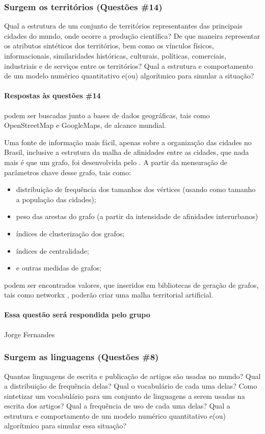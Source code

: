 \subsubsection{Surgem os territórios (Questões \#14)}

Qual a estrutura de um conjunto de territórios representantes das principais cidades do mundo, onde ocorre a produção científica? De que maneira representar os atributos sintéticos dos territórios, bem como os vínculos físicos, informacionais, similaridades históricas, culturais, políticas, comerciais, industriais e de serviços entre os territórios? Qual a estrutura e comportamento de um modelo numérico quantitativo e(ou) algorítmico para simular a situação? 

\paragraph{Respostas às questões \#14} podem ser buscadas junto a bases de dados geográficas, tais como OpenStreetMap e GoogleMaps, de alcance mundial. 

Uma fonte de informação mais fácil, apenas sobre a organização das cidades no Brasil, inclusive a estrutura da malha de afinidades entre as cidades, que nada mais é que um grafo, foi desenvolvida pelo \cite{ibge_regioes_2021}. 
A partir da mensuração de parâmetros chave desse grafo, tais como:
\begin{itemize}
    \item distribuição de frequência dos tamanhos dos vértices (usando como tamanho a população das cidades);
    \item peso das arestas do grafo (a partir da intensidade de afinidades interurbanos)
    \item índices de clusterização dos grafos;
    \item índices de centralidade;
    \item e outras medidas de grafos;
\end{itemize} 
podem ser encontrados valores, que inseridos em bibliotecas de geração de grafos, tais como networkx \citep{hagberg_exploring_2008}, poderão criar uma malha territorial artificial.

\paragraph{Essa questão será respondida pelo grupo} Jorge Fernandes

\subsubsection{Surgem as linguagens (Questões \#8)} Quantas linguagens de escrita e publicação de artigos são usadas no mundo? Qual a distribuição de frequência delas? Qual o vocabulário de cada uma delas? Como sintetizar um vocabulário para um conjunto de linguagens a serem usadas na escrita dos artigos? Qual a frequência de uso de cada uma delas? Qual a estrutura e comportamento de um modelo numérico quantitativo e(ou) algorítmico para simular essa situação?

